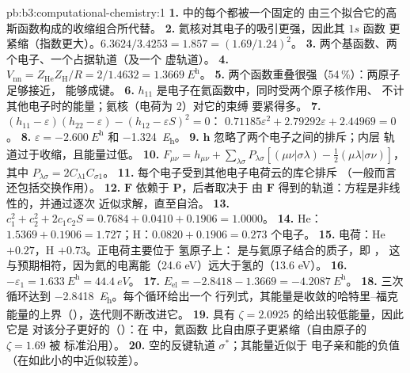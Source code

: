 \begin{solution}{pb:b3:computational-chemistry:1}
\textbf{1.} 中的每个都被一个固定的
由三个拟合它的高斯函数构成的收缩组合所代替。
\textbf{2.} 氦核对其电子的吸引更强，因此其 $1s$ 函数
更紧缩（指数更大）。$6.3624/3.4253 = 1.857 = (1.69/1.24)^2$。
\textbf{3.} 两个基函数、两个电子、一个占据轨道（及一个
虚轨道）。
\textbf{4.} $V_{\mathrm{nn}} = Z_{\mathrm{He}}Z_{\mathrm H}/R = 2/1.4632 =
\qty{1.3669}{\hartree}$。
\textbf{5.} 两个函数重叠很强（54\,\%）：两原子足够接近，
能够成键。
\textbf{6.} $h_{11}$ 是电子在氦函数中，同时受两个原子核作用、
不计其他电子时的能量；氦核（电荷为 2）对它的束缚
要紧得多。
\textbf{7.} $(h_{11} - \varepsilon)(h_{22} - \varepsilon) - (h_{12} - \varepsilon S)^2 = 0$：
$0.71185\varepsilon^2 + 2.79292\varepsilon + 2.44969 = 0$。
\textbf{8.} $\varepsilon = \qty{-2.600}{\hartree}$ 和 \qty{-1.324}{\hartree}。
\textbf{9.} $\mathbf h$ 忽略了两个电子之间的排斥；内层
轨道过于收缩，且能量过低。
\textbf{10.} $F_{\mu\nu} = h_{\mu\nu} + \sum_{\lambda\sigma}P_{\lambda\sigma}[(\mu\nu|\sigma\lambda) -
\frac12(\mu\lambda|\sigma\nu)]$，其中 $P_{\lambda\sigma} = 2C_{\lambda1}C_{\sigma1}$。
\textbf{11.} 每个电子受到其他电子电荷云的库仑排斥
（一般而言还包括交换作用）。
\textbf{12.} $\mathbf F$ 依赖于 $\mathbf P$，后者取决于
由 $\mathbf F$ 得到的轨道：方程是非线性的，并通过逐次
近似求解，直至自洽。
\textbf{13.} $c_1^2 + c_2^2 + 2c_1c_2S = 0.7684 + 0.0410 + 0.1906 = 1.0000$。
\textbf{14.} He：$1.5369 + 0.1906 = 1.727$；H：$0.0820 + 0.1906 = 0.273$
个电子。
\textbf{15.} 电荷：He $+0.27$，H $+0.73$。正电荷主要位于
氢原子上： 是与氦原子结合的质子，即 ，
这与预期相符，因为氦的电离能（24.6 eV）远大于氢的（13.6 eV）。
\textbf{16.} $-\varepsilon_1 = \qty{1.633}{\hartree} = \qty{44.4}{eV}$。
\textbf{17.} $E_{\mathrm{el}} = -2.8418 - 1.3669 = \qty{-4.2087}{\hartree}$。
\textbf{18.} 三次循环达到 \qty{-2.8418}{\hartree}。每个循环给出一个
行列式，其能量是收敛的哈特里–福克
能量的上界（），迭代则不断改进它。
\textbf{19.} 具有 $\zeta = 2.0925$ 的给出较低能量，因此它是
对该分子更好的（）：在  中，氦函数
比自由原子更紧缩（自由原子的 $\zeta = 1.69$ 被
标准沿用）。
\textbf{20.} 空的反键轨道 $\sigma^*$；其能量近似于
 电子亲和能的负值（在如此小的中近似较差）。

\end{solution}

